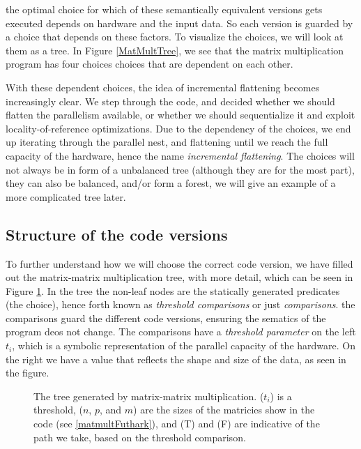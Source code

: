 the optimal choice for  which of these semantically equivalent versions gets 
executed depends on hardware and the input data. So each version is guarded by 
a choice that depends on these factors. To visualize the choices, we will look 
at them as a tree. In Figure \ref{MatMultTree}, we see that the matrix 
multiplication program has four choices choices that  are dependent on each 
other.
\begin{center}
  \centering 
  \label{MatMultTree}
\end{center}
With these dependent choices, the idea of incremental flattening becomes 
increasingly clear. We step through the code, and decided whether we should 
flatten the parallelism available, or whether we should sequentialize it and 
exploit locality-of-reference optimizations. Due to the dependency of the 
choices, we end up iterating through the parallel nest, and flattening until we 
reach the full capacity of the hardware, hence the name \textit{incremental 
flattening}. The choices will not always be in form of a unbalanced tree 
(although they are for the most part), they can also be balanced, and/or form a 
forest, we will give an example of a more complicated tree later.

\subsection{Structure of the code versions}
To further understand how we will choose the correct code version, we have 
filled out the matrix-matrix multiplication tree, with more detail, which can 
be seen in Figure \ref{MatMultTreeFilled}. In the tree the non-leaf nodes are 
the statically generated predicates (the choice), hence forth known as 
\textit{threshold comparisons} or just \textit{comparisons}. the comparisons  
guard the different code versions, ensuring the sematics of the program deos 
not change. The comparisons have a \textit{threshold parameter} on the left 
$t_i$, which is a symbolic representation of the parallel capacity of the 
hardware. On the right we have a value that reflects the shape and size of the 
data, as seen in the figure.

\begin{figure}
  \centering 
  \caption{The tree generated by matrix-matrix multiplication.  ($t_i$) is a 
  threshold, ($n$, $p$, and $m$) are the sizes of the matricies show in the 
code (see \ref{matmultFuthark}), and (T) and (F) are indicative of the path we 
take, based on the threshold comparison.}
  \label{MatMultTreeFilled}
\end{figure}

